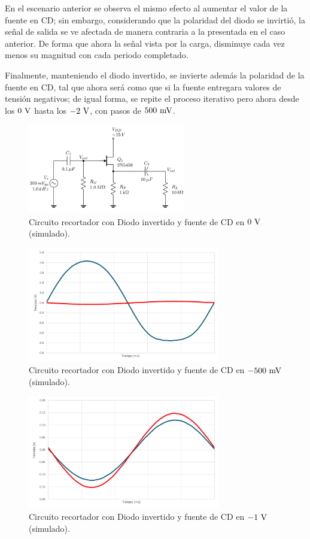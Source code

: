 \documentclass[journal]{IEEEtran}
\begin{document}
En el escenario anterior se observa el mismo efecto al aumentar el valor de la fuente en CD; sin embargo, considerando
que la polaridad del diodo se invirtió, la señal de salida se ve afectada de manera contraria a la presentada en el caso anterior.
De forma que ahora la señal vista por la carga, disminuye cada vez menos su magnitud con cada periodo completado.

Finalmente, manteniendo el diodo invertido, se invierte además la polaridad de la fuente en CD, tal que ahora será como que si la fuente
entregara valores de tensión negativos; de igual forma, se repite el proceso iterativo pero ahora desde los $0~\textnormal{V}$ hasta los $-2~\textnormal{V}$, con pasos de $500~\textnormal{mV}$.
\begin{figure}[H]
        \centering
        \includegraphics[width=2.7in]{CIRC2.png}
        \caption{Circuito recortador con Diodo invertido y fuente de CD en $0~\textnormal{V}$ (simulado).}
        \label{fig:SignalSimulated_15}
\end{figure}
\vspace{-0.6cm}
\begin{figure}[H]
        \centering
        \includegraphics[width=3.3in]{C1111.png}
        \caption{Circuito recortador con Diodo invertido y fuente de CD en $-500~\textnormal{mV}$ (simulado).}
        \label{fig:SignalSimulated_16}
\end{figure}
\begin{figure}[H]
        \centering
        \includegraphics[width=3.3in]{C2222.png}
        \caption{Circuito recortador con Diodo invertido y fuente de CD en $-1~\textnormal{V}$ (simulado).}
        \label{fig:SignalSimulated_17}
\end{figure}
\end{document}

